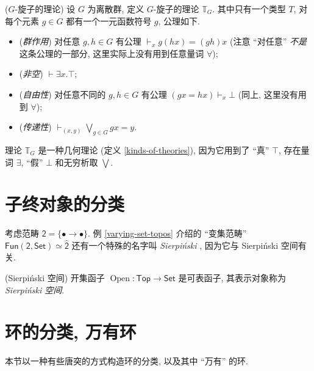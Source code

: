 \begin{definition}
	{($G$-旋子的理论)}
	设 $G$ 为离散群, 定义 $G$-旋子的理论 $\mathbb T_G$.
	其中只有一个类型 $T$, 对每个元素 $g\in G$ 都有一个一元函数符号 $g$, 公理如下.
	\begin{itemize}
		\item (\emph{群作用}) 对任意 $g,h\in G$ 有公理 $\vdash_x g(hx)=(gh)x$ (注意 ``对任意'' \emph{不是}这条公理的一部分, 这里实际上没有用到任意量词 $\forall$);
		\item (\emph{非空}) $\vdash \exists x. \top$;
		\item (\emph{自由性}) 对任意不同的 $g,h\in G$ 有公理 $(gx=hx)\vdash_x \bot$ (同上, 这里没有用到 $\forall$);
		\item (\emph{传递性}) $\displaystyle\vdash_{(x,y)}\bigvee_{g\in G}gx=y$.
	\end{itemize}
\end{definition}

理论 $\mathbb T_G$ 是一种几何理论 (定义 \ref{kinds-of-theories}), 因为它用到了 ``真'' $\top$, 存在量词 $\exists$, ``假'' $\bot$ 和无穷析取 $\bigvee$.

\section{子终对象的分类\topos}

考虑范畴 $\mathsf 2 = \{\bullet\longrightarrow\bullet\}$. 例 \ref{varying-set-topos} 介绍的 ``变集范畴'' $\mathsf {Fun}(\mathsf {2},\mathsf {Set})\simeq\widehat {\mathsf {2}}$ 还有一个特殊的名字叫 \emph{Sierpi\'nski \topos{}}, 因为它与 Sierpi\'nski 空间有关.

\begin{propdef}
	{(Sierpi\'nski 空间)}
	开集函子 $\operatorname{Open}\colon \mathsf {Top}\to \mathsf {Set}$ 是可表函子, 其表示对象称为 \emph{Sierpi\'nski 空间}.
\end{propdef}

\todo{}

\section{环的分类\topos{}, 万有环}

本节以一种有些唐突的方式构造环的分类\topos{}, 以及其中 ``万有'' 的环. %

